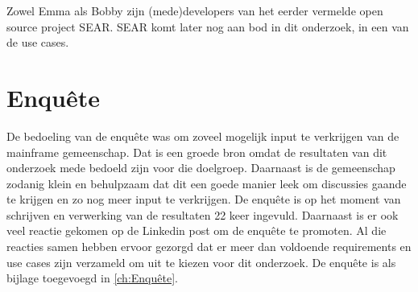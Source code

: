 Zowel Emma als Bobby zijn (mede)developers van het eerder vermelde open source project SEAR. SEAR komt later nog aan bod in dit onderzoek, in een van de use cases.

\section{Enquête}
De bedoeling van de enquête was om zoveel mogelijk input te verkrijgen van de mainframe gemeenschap. Dat is een groede bron omdat de resultaten van dit onderzoek mede bedoeld zijn voor die doelgroep. Daarnaast is de gemeenschap zodanig klein en behulpzaam dat dit een goede manier leek om discussies gaande te krijgen en zo nog meer input te verkrijgen. De enquête is op het moment van schrijven en verwerking van de resultaten 22 keer ingevuld. Daarnaast is er ook veel reactie gekomen op de Linkedin post om de enquête te promoten. Al die reacties samen hebben ervoor gezorgd dat er meer dan voldoende requirements en use cases zijn verzameld om uit te kiezen voor dit onderzoek. De enquête is als bijlage toegevoegd in \ref{ch:Enquête}.


